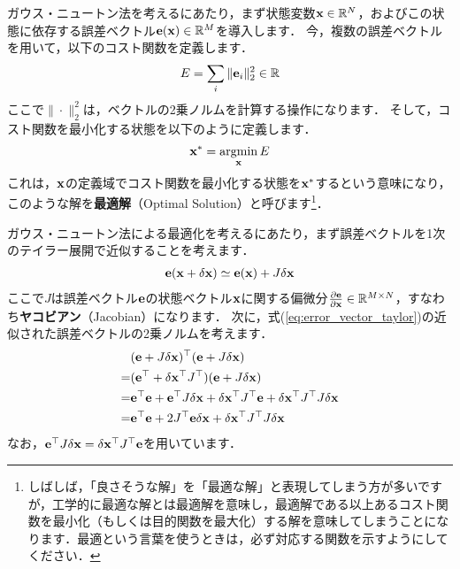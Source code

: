 ガウス・ニュートン法を考えるにあたり，まず状態変数${\bf x} \in \mathbb{R}^{N}$，およびこの状態に依存する誤差ベクトル${\bf e}( {\bf x} ) \in \mathbb{R}^{M}$を導入します．
今，複数の誤差ベクトルを用いて，以下のコスト関数を定義します．
%
\begin{align}
  E = \sum_{i} \| {\bf e}_{i} \|_{2}^{2} \in \mathbb{R}
\end{align}
%
ここで$\| \cdot \|_{2}^{2}$は，ベクトルの2乗ノルムを計算する操作になります．
そして，コスト関数を最小化する状態を以下のように定義します．
%
\begin{align}
  {\bf x}^{*} = \mathop{\rm argmin}\limits_{ {\bf x} } E
\end{align}
%
これは，${\bf x}$の定義域でコスト関数を最小化する状態を${\bf x}^{*}$するという意味になり，このような解を{\bf 最適解}（Optimal Solution）と呼びます\footnote{しばしば，「良さそうな解」を「最適な解」と表現してしまう方が多いですが，工学的に最適な解とは最適解を意味し，最適解である以上あるコスト関数を最小化（もしくは目的関数を最大化）する解を意味してしまうことになります．最適という言葉を使うときは，必ず対応する関数を示すようにしてください．}．

ガウス・ニュートン法による最適化を考えるにあたり，まず誤差ベクトルを1次のテイラー展開で近似することを考えます．
%
\begin{align}
  {\bf e}( {\bf x} + \delta {\bf x} ) \simeq {\bf e}( {\bf x} ) + J \delta {\bf x}
  \label{eq:error_vector_taylor}
\end{align}
%
ここで$J$は誤差ベクトル${\bf e}$の状態ベクトル${\bf x}$に関する偏微分$\frac{ \partial {\bf e} }{ \partial {\bf x} } \in \mathbb{R}^{M \times N}$，すなわち{\bf ヤコビアン}（Jacobian）になります．
次に，式(\ref{eq:error_vector_taylor})の近似された誤差ベクトルの2乗ノルムを考えます．
%
\begin{align}
  \begin{split}
    & ( {\bf e} + J \delta {\bf x} )^{\top} ( {\bf e} + J \delta {\bf x} ) \\
    = & ( {\bf e}^{\top} + \delta {\bf x}^{\top} J^{\top} ) ( {\bf e} + J \delta {\bf x} ) \\
    = & {\bf e}^{\top} {\bf e} + {\bf e}^{\top} J \delta {\bf x} + \delta {\bf x}^{\top} J^{\top} {\bf e} + \delta {\bf x}^{\top} J^{\top} J \delta {\bf x} \\
    = & {\bf e}^{\top} {\bf e} + 2 J^{\top} {\bf e} \delta {\bf x} + \delta {\bf x}^{\top} J^{\top} J \delta {\bf x}
  \end{split}
  \label{eq:error_vector_taylor_sq_norm}
\end{align}
%
なお，${\bf e}^{\top} J \delta {\bf x} = \delta {\bf x}^{\top} J^{\top} {\bf e}$を用いています．

